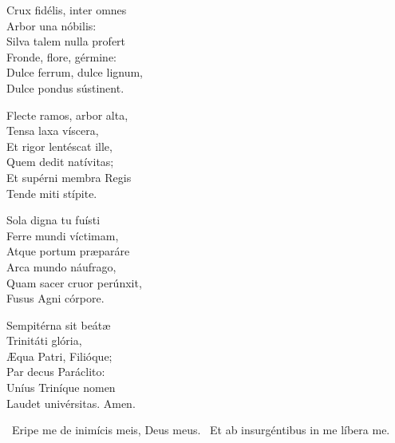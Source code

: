 Crux fidélis, inter omnes\\
Arbor una nóbilis:\\
Silva talem nulla profert\\
Fronde, flore, gérmine:\\
Dulce ferrum, dulce lignum,\\
Dulce pondus sústinent.

Flecte ramos, arbor alta,\\
Tensa laxa víscera,\\
Et rigor lentéscat ille,\\
Quem dedit natívitas;\\
Et supérni membra Regis\\
Tende miti stípite.

Sola digna tu fuísti\\
Ferre mundi víctimam,\\
Atque portum præparáre\\
Arca mundo náufrago,\\
Quam sacer cruor perúnxit,\\
Fusus Agni córpore.

Sempitérna sit beátæ\\
Trinitáti glória,\\
Æqua Patri, Filióque;\\
Par decus Paráclito:\\
Uníus Triníque nomen\\
Laudet univérsitas. Amen.

\V\ Eripe me de inimícis meis, Deus meus. \R\ Et ab insurgéntibus in me líbera me.




\sectionornament




